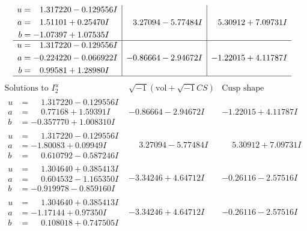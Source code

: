 \documentclass[1p]{elsarticle_modified}
\theoremstyle{definition}
\newcommand{\I}{\sqrt{-1}}
\begin{document}
$$\begin{array}{c|c|c}
\begin{aligned}
u &= \phantom{-}1.317220 - 0.129556 I \\
a &= \phantom{-}1.51101 + 0.25470 I \\
b &= -1.07397 + 1.07535 I\end{aligned}
 & \phantom{-}3.27094 - 5.77484 I & \phantom{-}5.30912 + 7.09731 I \\ \hline\begin{aligned}
u &= \phantom{-}1.317220 - 0.129556 I \\
a &= -0.224220 - 0.066922 I \\
b &= \phantom{-}0.99581 + 1.28980 I\end{aligned}
 & -0.86664 - 2.94672 I & -1.22015 + 4.11787 I\\
 \hline 
 \end{array}$$\newpage$$\begin{array}{c|c|c}  
\text{Solutions to }I^u_{2}& \I (\text{vol} + \sqrt{-1}CS) & \text{Cusp shape}\\
 \hline 
\begin{aligned}
u &= \phantom{-}1.317220 - 0.129556 I \\
a &= \phantom{-}0.77168 + 1.59391 I \\
b &= -0.357770 + 1.008310 I\end{aligned}
 & -0.86664 - 2.94672 I & -1.22015 + 4.11787 I \\ \hline\begin{aligned}
u &= \phantom{-}1.317220 - 0.129556 I \\
a &= -1.80083 + 0.09949 I \\
b &= \phantom{-}0.610792 - 0.587246 I\end{aligned}
 & \phantom{-}3.27094 - 5.77484 I & \phantom{-}5.30912 + 7.09731 I \\ \hline\begin{aligned}
u &= \phantom{-}1.304640 + 0.385413 I \\
a &= \phantom{-}0.604532 - 1.165350 I \\
b &= -0.919978 - 0.859160 I\end{aligned}
 & -3.34246 + 4.64712 I & -0.26116 - 2.57516 I \\ \hline\begin{aligned}
u &= \phantom{-}1.304640 + 0.385413 I \\
a &= -1.17144 + 0.97350 I \\
b &= \phantom{-}0.108018 + 0.747505 I\end{aligned}
 & -3.34246 + 4.64712 I & -0.26116 - 2.57516 I \\ \hline\begin{aligned}

\end{aligned}
\end{array}$$
\end{document}
